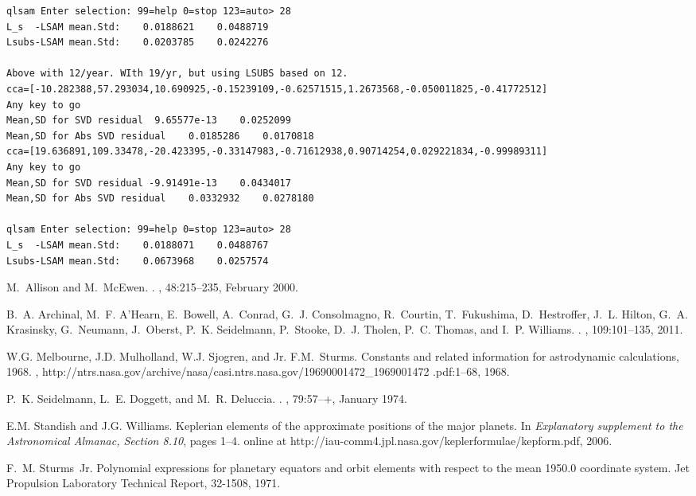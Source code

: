 \documentclass[draft]{article}
\begin{document}
\begin{verbatim}
qlsam Enter selection: 99=help 0=stop 123=auto> 28
L_s  -LSAM mean.Std:    0.0188621    0.0488719
Lsubs-LSAM mean.Std:    0.0203785    0.0242276

Above with 12/year. WIth 19/yr, but using LSUBS based on 12. 
cca=[-10.282388,57.293034,10.690925,-0.15239109,-0.62571515,1.2673568,-0.050011825,-0.41772512]
Any key to go
Mean,SD for SVD residual  9.65577e-13    0.0252099
Mean,SD for Abs SVD residual    0.0185286    0.0170818
cca=[19.636891,109.33478,-20.423395,-0.33147983,-0.71612938,0.90714254,0.029221834,-0.99989311]
Any key to go
Mean,SD for SVD residual -9.91491e-13    0.0434017
Mean,SD for Abs SVD residual    0.0332932    0.0278180

qlsam Enter selection: 99=help 0=stop 123=auto> 28
L_s  -LSAM mean.Std:    0.0188071    0.0488767
Lsubs-LSAM mean.Std:    0.0673968    0.0257574
\end{verbatim}

\begin{thebibliography}{Seidelmann74ww}

M.~{Allison} and M.~{McEwen}.
.
, 48:215--235, February 2000.

B.~A. {Archinal}, M.~F. {A'Hearn}, E.~{Bowell}, A.~{Conrad}, G.~J.
  {Consolmagno}, R.~{Courtin}, T.~{Fukushima}, D.~{Hestroffer}, J.~L. {Hilton},
  G.~A. {Krasinsky}, G.~{Neumann}, J.~{Oberst}, P.~K. {Seidelmann},
  P.~{Stooke}, D.~J. {Tholen}, P.~C. {Thomas}, and I.~P. {Williams}.
.
, 109:101--135,
  2011.

W.G. Melbourne, J.D. Mulholland, W.J. Sjogren, and Jr. F.M.~Sturms.
\newblock Constants and related information for astrodynamic calculations,
  1968.
,
  http://ntrs.nasa.gov/archive/nasa/casi.ntrs.nasa.gov/19690001472\_1969001472%
.pdf:1--68, 1968.

P.~K. {Seidelmann}, L.~E. {Doggett}, and M.~R. {Deluccia}.
.
, 79:57--+, January 1974.

E.M. Standish and J.G. Williams.
\newblock Keplerian elements of the approximate positions of the major planets.
\newblock In {\em Explanatory supplement to the Astronomical Almanac, Section
  8.10}, pages 1--4. online at
  http://iau-comm4.jpl.nasa.gov/keplerformulae/kepform.pdf, 2006.

F.~M. Sturms~Jr.
\newblock Polynomial expressions for planetary equators and orbit elements with
  respect to the mean 1950.0 coordinate system.
\newblock Jet Propulsion Laboratory Technical Report, 32-1508, 1971.

\end{thebibliography}
\end{document}

